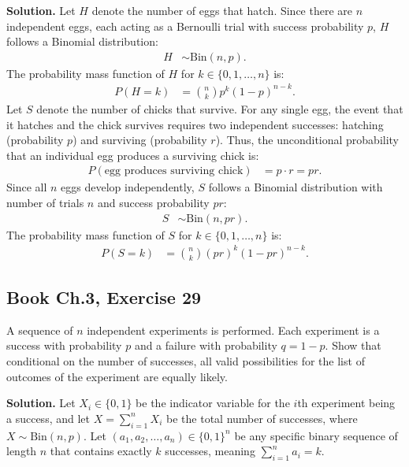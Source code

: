 \documentclass[11pt,a4paper]{article}
\begin{document}
\noindent \textbf{Solution.} Let $H$ denote the number of eggs that hatch. Since there are $n$ independent eggs, each acting as a Bernoulli trial with success probability $p$, $H$ follows a Binomial distribution:
\begin{align*}
H &\sim \text{Bin}(n, p).
\end{align*}
The probability mass function of $H$ for $k \in \{0, 1, \dots, n\}$ is:
\begin{align*}
P(H = k) &= \binom{n}{k} p^k (1-p)^{n-k}.
\end{align*}
Let $S$ denote the number of chicks that survive. For any single egg, the event that it hatches and the chick survives requires two independent successes: hatching (probability $p$) and surviving (probability $r$). Thus, the unconditional probability that an individual egg produces a surviving chick is:
\begin{align*}
P(\text{egg produces surviving chick}) &= p \cdot r = pr.
\end{align*}
Since all $n$ eggs develop independently, $S$ follows a Binomial distribution with number of trials $n$ and success probability $pr$:
\begin{align*}
S &\sim \text{Bin}(n, pr).
\end{align*}
The probability mass function of $S$ for $k \in \{0, 1, \dots, n\}$ is:
\begin{align*}
P(S = k) &= \binom{n}{k} (pr)^k (1 - pr)^{n-k}.
\end{align*}

\vspace{10pt}
\subsection{Book Ch.3, Exercise 29}
\begin{tcolorbox}[title={Book Ch.3, Exercise 29}]
A sequence of $n$ independent experiments is performed. Each experiment is a success with probability $p$ and a failure with probability $q = 1 - p$. Show that conditional on the number of successes, all valid possibilities for the list of outcomes of the experiment are equally likely.
\end{tcolorbox}

\noindent \textbf{Solution.} Let $X_i \in \{0, 1\}$ be the indicator variable for the $i$th experiment being a success, and let $X = \sum_{i=1}^{n} X_i$ be the total number of successes, where $X \sim \text{Bin}(n, p)$. Let $(a_1, a_2, \dots, a_n) \in \{0, 1\}^n$ be any specific binary sequence of length $n$ that contains exactly $k$ successes, meaning $\sum_{i=1}^{n} a_i = k$. 
\end{document}
